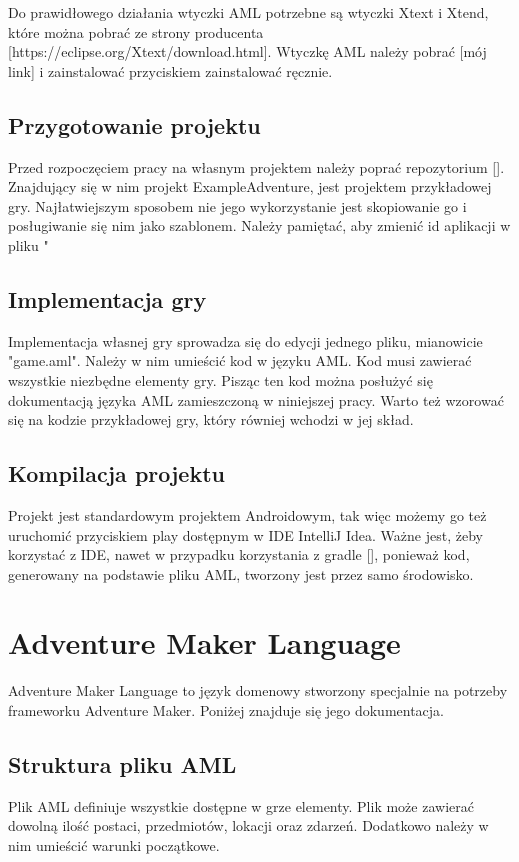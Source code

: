 \documentclass	{xmgr}
\begin{document}
Do prawidłowego działania wtyczki AML potrzebne są wtyczki Xtext i Xtend, które można pobrać ze strony producenta [https://eclipse.org/Xtext/download.html].
Wtyczkę AML należy pobrać [mój link] i zainstalować przyciskiem zainstalować ręcznie.

\section{Przygotowanie projektu}
Przed rozpoczęciem pracy na własnym projektem należy poprać repozytorium []. Znajdujący się w nim projekt ExampleAdventure, jest projektem przykładowej gry. Najłatwiejszym sposobem nie jego wykorzystanie jest skopiowanie go i posługiwanie się nim jako szablonem. Należy pamiętać, aby zmienić id aplikacji w pliku "

\section{Implementacja gry}
Implementacja własnej gry sprowadza się do edycji jednego pliku, mianowicie "game.aml". Należy w nim umieścić kod w języku AML. Kod musi  zawierać wszystkie niezbędne elementy gry. Pisząc ten kod można posłużyć się dokumentacją języka AML zamieszczoną w niniejszej pracy. Warto też wzorować się na kodzie przykładowej gry, który równiej wchodzi w jej skład.

\section{Kompilacja projektu}
Projekt jest standardowym projektem Androidowym, tak więc możemy go też uruchomić przyciskiem play dostępnym w IDE IntelliJ Idea. Ważne jest, żeby korzystać z IDE, nawet w przypadku korzystania z gradle [], ponieważ kod, generowany na podstawie pliku AML, tworzony jest przez samo środowisko.

\chapter{Adventure Maker Language} 
Adventure Maker Language to język domenowy stworzony specjalnie na potrzeby frameworku Adventure Maker. Poniżej znajduje się jego dokumentacja.

\section{Struktura pliku AML} 
Plik AML definiuje wszystkie dostępne w grze elementy. Plik może zawierać dowolną ilość postaci, przedmiotów, lokacji oraz zdarzeń. Dodatkowo należy w nim umieścić warunki początkowe. 
\end{document}
